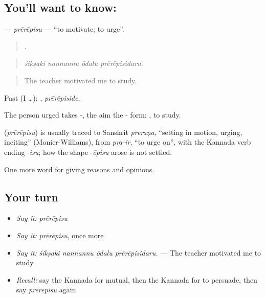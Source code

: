 \subsection*{You'll want to know: }
\textbf{} — \emph{prērēpisu} — \textquotedblleft{}to motivate; to urge\textquotedblright{}.

\begin{quote}
   .
\end{quote}

\begin{quote}
\emph{śikṣaki nannannu ōdalu prērēpisidaru.}
\end{quote}

\begin{quote}
The teacher motivated me to study.
\end{quote}

Past (I …): , \emph{prērēpiside}.

The person urged takes -, the aim the - form: , to study.

\begin{cousinweb}
\textbf{} (\emph{prērēpisu}) is usually traced to Sanskrit \emph{preraṇa}, \textquotedblleft{}setting in motion, urging, inciting\textquotedblright{} (Monier-Williams), from \emph{pra-īr}, \textquotedblleft{}to urge on\textquotedblright{}, with the Kannada verb ending -\emph{isu}; how the shape -\emph{ēpisu} arose is not settled.
\end{cousinweb}

\begin{grammarlens}[title={What you've built}]
One more word for giving reasons and opinions.
\end{grammarlens}

\subsection*{Your turn}
\begin{itemize}
\raggedright
  \item \emph{Say it:} \emph{prērēpisu}
  \item \emph{Say it:} \emph{prērēpisu}, once more
  \item \emph{Say it:} \emph{śikṣaki nannannu ōdalu prērēpisidaru.} — The teacher motivated me to study.
  \item \emph{Recall:} say the Kannada for mutual, then the Kannada for to persuade, then say \emph{prērēpisu} again
\end{itemize}

